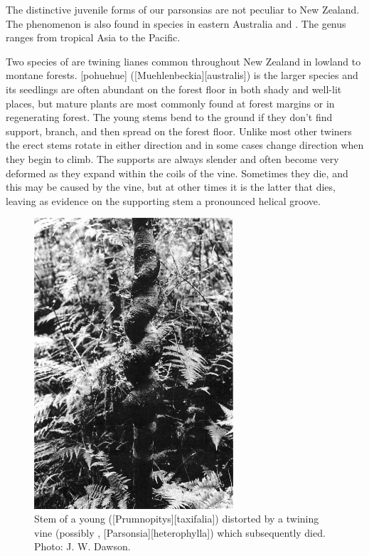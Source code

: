 The distinctive juvenile forms of our parsonsias are not peculiar to New Zealand.
The phenomenon is also found in species in eastern Australia and .
The genus ranges from tropical Asia to the Pacific.

Two species of  are twining lianes common throughout New Zealand in lowland to montane forests.
[pohuehue] ([Muehlenbeckia][australis]) is the larger species and its seedlings are often abundant on the forest floor in both shady and well-lit places, but mature plants are most commonly found at forest margins or in regenerating forest.
The young stems bend to the ground if they don't find support, branch, and then spread on the forest floor.
Unlike most other twiners the erect stems rotate in either direction and in some cases change direction when they begin to climb.
The supports are always slender and often become very deformed as they expand within the coils of the vine.
Sometimes they die, and this may be caused by the vine, but at other times it is the latter that dies, leaving as evidence on the supporting stem a pronounced helical groove.

\begin{figure}
	\includegraphics[width=0.66\textwidth]{graphics/figure35matai.jpg}
	\centering
	\caption[Stem of a young matai]{Stem of a young  ([Prumnopitys][taxifalia]) distorted by a twining vine (possibly , [Parsonsia][heterophylla]) which subsequently died.
	Photo: J. W. Dawson.}%
	\label{fig:35matai}%
\end{figure}

